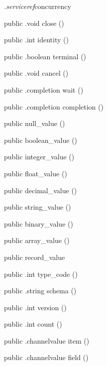 \begin{CrexxClass}{\textit{.serviceref}}{concurrency}
\begin{Members}
    \Method
      {public}
      {.void}
      {close}
      {()}

    \Method
      {public}
      {.int}
      {identity}
      {()}

    \Method
      {public}
      {.boolean}
      {terminal}
      {()}

    \Method
      {public}
      {.void}
      {cancel}
      {()}

    \Method
      {public}
      {.completion}
      {wait}
      {()}

    \Method
      {public}
      {.completion}
      {completion}
      {()}

    \Factory
      {public}
      {null\_value}
      {()}

    \Factory
      {public}
      {boolean\_value}
      {()}

    \Factory
      {public}
      {integer\_value}
      {()}

    \Factory
      {public}
      {float\_value}
      {()}

    \Factory
      {public}
      {decimal\_value}
      {()}

    \Factory
      {public}
      {string\_value}
      {()}

    \Factory
      {public}
      {binary\_value}
      {()}

    \Factory
      {public}
      {array\_value}
      {()}

    \Factory
      {public}
      {record\_value}
      {}

    \Method
      {public}
      {.int}
      {type\_code}
      {()}

    \Method
      {public}
      {.string}
      {schema}
      {()}

    \Method
      {public}
      {.int}
      {version}
      {()}

    \Method
      {public}
      {.int}
      {count}
      {()}

    \Method
      {public}
      {.channelvalue}
      {item}
      {()}

    \Method
      {public}
      {.channelvalue}
      {field}
      {()}


\end{Members}
\end{CrexxClass}
